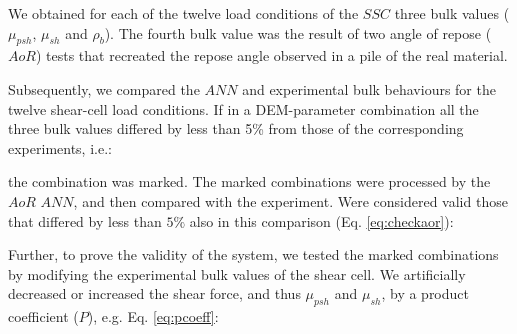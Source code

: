 We obtained for each of the twelve load conditions of the $SSC$ three bulk
values ($\mu_{psh}$, $\mu_{sh}$ and $\rho_b$).
The fourth bulk value was the result of two angle of repose ($AoR$) tests that
recreated the repose angle observed in a pile of the
real material. 

Subsequently, we compared the $ANN$ and experimental bulk behaviours for the
twelve shear-cell load conditions.
If in a DEM-parameter combination all the three bulk values differed by less 
than 5\% from those of the corresponding experiments, i.e.:

the combination was marked. The marked combinations were processed by the
$AoR$ $ANN$, and then compared with the experiment.
Were considered valid those that differed by less than $5\%$ also in this
comparison (Eq. \ref{eq:checkaor}):

Further, to prove the validity of the system, we tested the marked combinations
by modifying the experimental bulk values of the shear cell. 
We artificially decreased or increased the shear force, and thus $\mu_{psh}$ and
$\mu_{sh}$, by a product coefficient ($P$), e.g. Eq. \ref{eq:pcoeff}:
